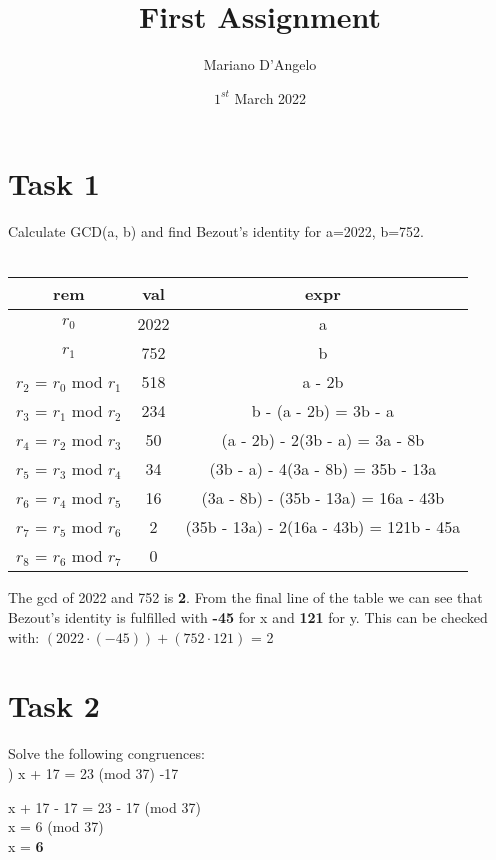 \documentclass[12pt]{article}
\title{First Assignment}
\author{Mariano D'Angelo}
\date{$1^{st}$ March 2022}
\begin{document}
\maketitle


\section*{Task 1}
Calculate GCD(a, b) and find Bezout's identity for a=2022, b=752. \\\\
\begin{tabular}{ | c | c | c | } \hline
    \textbf{rem} & \textbf{val} & \textbf{expr} \\ \hline
    $r_0$ & 2022 & a \\
    $r_1$ & 752 & b \\
    $r_2$ = $r_0$ mod $r_1$ & 518 & a - 2b \\
    $r_3$ = $r_1$ mod $r_2$ & 234 & b - (a - 2b) = 3b - a \\
    $r_4$ = $r_2$ mod $r_3$ & 50 & (a - 2b) - 2(3b - a) = 3a - 8b \\
    $r_5$ = $r_3$ mod $r_4$ & 34 & (3b - a) - 4(3a - 8b) = 35b - 13a \\
    $r_6$ = $r_4$ mod $r_5$ & 16 & (3a - 8b) - (35b - 13a) = 16a - 43b \\
    $r_7$ = $r_5$ mod $r_6$ & 2 & (35b - 13a) - 2(16a - 43b) = 121b - 45a \\ \hline
    $r_8$ = $r_6$ mod $r_7$ & 0 & \\ \hline
\end{tabular}

\noindent \newline \newline The gcd of 2022 and 752 is \textbf{2}. \newline
From the final line of the table we can see that Bezout's identity is fulfilled
with \textbf{-45} for x and \textbf{121} for y.\newline
This can be checked with: $(2022 \cdot (-45)) + (752 \cdot 121)$ = 2

\pagebreak


\section*{Task 2} 

Solve the following congruences: \\

) x + 17 = 23 (mod 37) \textbar{} -17
\begin{addmargin}[1.22em]{0em}
x + 17 - 17 = 23 - 17 (mod 37) \\
x = 6 (mod 37) \\
x = \textbf{6} \\
\end{addmargin}
\end{document}
